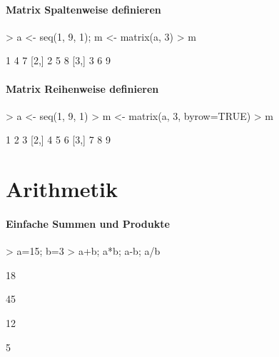 \paragraph{Matrix Spaltenweise definieren}
\begin{Schunk}
\begin{Sinput}
> a <- seq(1, 9, 1); m <- matrix(a, 3)
> m
\end{Sinput}
\begin{Soutput}
     [,1] [,2] [,3]
[1,]    1    4    7
[2,]    2    5    8
[3,]    3    6    9
\end{Soutput}
\end{Schunk}

\paragraph{Matrix Reihenweise definieren}
\begin{Schunk}
\begin{Sinput}
> a <- seq(1, 9, 1)
> m <- matrix(a, 3, byrow=TRUE)
> m
\end{Sinput}
\begin{Soutput}
     [,1] [,2] [,3]
[1,]    1    2    3
[2,]    4    5    6
[3,]    7    8    9
\end{Soutput}
\end{Schunk}

\section{Arithmetik}
\paragraph{Einfache Summen und Produkte}
\begin{Schunk}
\begin{Sinput}
> a=15; b=3
> a+b; a*b; a-b; a/b
\end{Sinput}
\begin{Soutput}
[1] 18
\end{Soutput}
\begin{Soutput}
[1] 45
\end{Soutput}
\begin{Soutput}
[1] 12
\end{Soutput}
\begin{Soutput}
[1] 5
\end{Soutput}
\end{Schunk}

